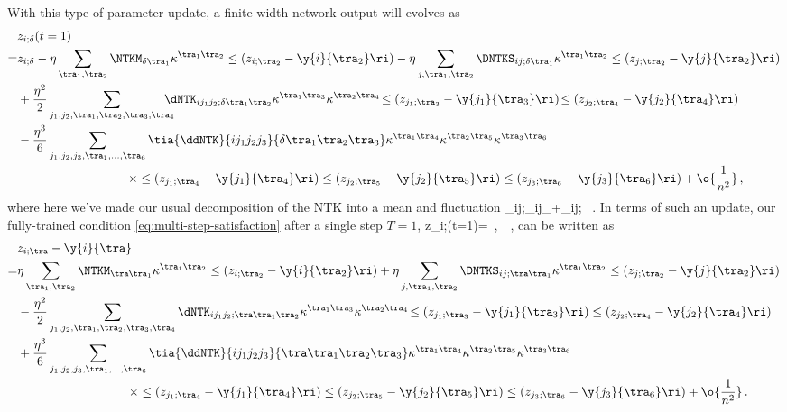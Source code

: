 With this type of parameter update, a finite-width network output will evolves as
\begin{align}\label{eq:preactivation-updated-finite-width-decomposition-kappa}
&z_{i;\delta}(t=1)\, \\
=&z_{i;\delta}-\eta\sum_{\tra_1, \tra_2}\NTKM_{\delta\tra_1}\kappa^{\tra_1\tra_2}\le(z_{i;\tra_2}-\y{i}{\tra_2}\ri) -\eta\sum_{j,\tra_1, \tra_2}\DNTKS_{ij;\delta\tra_1}\kappa^{\tra_1\tra_2}\le(z_{j;\tra_2}-\y{j}{\tra_2}\ri) \, \notag\\
&+\frac{\eta^2}{2}\sum_{j_1,j_2,\tra_1,\tra_2,\tra_3,\tra_4}\!\!\!\!\!\!\dNTK_{i j_1j_2;\delta\tra_1\tra_2} \kappa^{\tra_1\tra_3}\kappa^{\tra_2\tra_4}\! \le(z_{j_1;\tra_3}-\y{j_1}{\tra_3}\ri)\!\le(z_{j_2;\tra_4}-\y{j_2}{\tra_4}\ri) \, \notag \\
&-\frac{\eta^3}{6}\sum_{j_1,j_2,j_3,\tra_1,\ldots, \tra_6}\tia{\ddNTK}{i j_1j_2j_3}{\delta\tra_1\tra_2\tra_3}  
\kappa^{\tra_1\tra_4}\kappa^{\tra_2\tra_5}\kappa^{\tra_3\tra_6} \, \notag \\
&\qquad\qquad\qquad\qquad\quad\times\le(z_{j_1;\tra_4}-\y{j_1}{\tra_4}\ri)\le(z_{j_2;\tra_5}-\y{j_2}{\tra_5}\ri)\le(z_{j_3;\tra_6}-\y{j_3}{\tra_6}\ri)
+\o{\frac{1}{n^2}}\, ,\notag
\end{align}
where here we've made our usual decomposition of the NTK into a mean and fluctuation %
\be
\NTK_{ij;\delta\tra}\equiv\delta_{ij}\NTKM_{\delta\tra}+\DNTKS_{ij;\delta\tra} \, .
\ee
In terms of such an update, our fully-trained condition \eqref{eq:multi-step-satisfaction} after a single step $T=1$,
\be
z_{i;\tra}(t=1)= \,,\qquad {}\ \tra\in\A\, ,
\ee
can be written as
\begin{align}\label{eq:what-we-want-rearranged-finite-width}
&z_{i;\tra}-\y{i}{\tra}\, \\
=&\eta\sum_{\tra_1, \tra_2}\NTKM_{\tra\tra_1}\kappa^{\tra_1\tra_2}\le(z_{i;\tra_2}-\y{i}{\tra_2}\ri) +\eta\sum_{j,\tra_1, \tra_2}\DNTKS_{ij;\tra\tra_1}\kappa^{\tra_1\tra_2}\le(z_{j;\tra_2}-\y{j}{\tra_2}\ri)  \, \notag\\
&-\frac{\eta^2}{2}\sum_{j_1,j_2,\tra_1,\tra_2,\tra_3,\tra_4}\dNTK_{i j_1j_2;\tra\tra_1\tra_2}\kappa^{\tra_1\tra_3}\kappa^{\tra_2\tra_4}\!\le(z_{j_1;\tra_3}-\y{j_1}{\tra_3}\ri)\le(z_{j_2;\tra_4}-\y{j_2}{\tra_4}\ri) \, \notag \\
&+\frac{\eta^3}{6}\sum_{j_1,j_2,j_3,\tra_1,\ldots, \tra_6}\tia{\ddNTK}{i j_1j_2j_3}{\tra\tra_1\tra_2\tra_3}  
\kappa^{\tra_1\tra_4}\kappa^{\tra_2\tra_5}\kappa^{\tra_3\tra_6}  \, \notag \\
&\qquad\qquad\qquad\qquad\quad\times \le(z_{j_1;\tra_4}-\y{j_1}{\tra_4}\ri)\le(z_{j_2;\tra_5}-\y{j_2}{\tra_5}\ri)\le(z_{j_3;\tra_6}-\y{j_3}{\tra_6}\ri)
+\o{\frac{1}{n^2}}
\, . \notag
\end{align}
